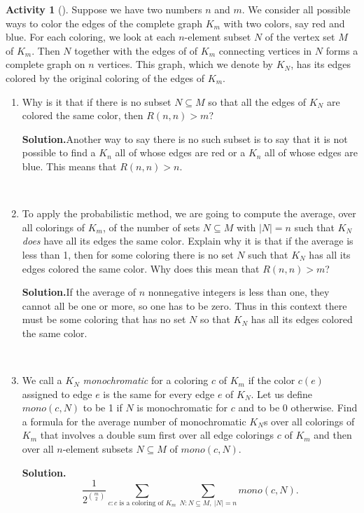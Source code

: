 \documentclass[10pt,]{book}
\theoremstyle{plain}
\theoremstyle{definition}
\newtheorem{activity}[project]{Activity}
\numberwithin{equation}{chapter}
\begin{document}
\begin{activity}[]\label{activity-82}
Suppose we have two numbers \(n\) and \(m\). We consider all possible ways to color the edges of the complete graph \(K_m\) with two colors, say red and blue. For each coloring, we look at each \(n\)-element subset \(N\) of the vertex set \(M\) of \(K_m\). Then \(N\) together with the edges of of \(K_m\) connecting vertices in \(N\) forms a complete graph on \(n\) vertices. This graph, which we denote by \(K_N\), has its edges colored by the original coloring of the edges of \(K_m\).%
~\par
\begin{enumerate}[label=(\alph*)]
 \item Why is it that if there is no subset \(N\subseteq M\) so that all the edges of \(K_N\) are colored the same color, then \(R(n,n)>m\)?%
\par\medskip\noindent%
\textbf{Solution.}\quad Another way to say there is no such subset is to say that it is not possible to find a \(K_n\) all of whose edges are red or a \(K_n\) all of whose edges are blue. This means that \(R(n,n)>n\).%

~\par
\item To apply the probabilistic method, we are going to compute the average, over all colorings of \(K_m\), of the number of sets \(N\subseteq M\) with \(|N|=n\) such that \(K_N\) \emph{does} have all its edges the same color. Explain why it is that if the average is less than 1, then for some coloring there is no set \(N\) such that \(K_N\) has all its edges colored the same color.  Why does this mean that \(R(n,n)>m\)?%
\par\medskip\noindent%
\textbf{Solution.}\quad If the average of \(n\) nonnegative integers is less than one, they cannot all be one or more, so one has to be zero. Thus in this context there must be some coloring that has no set \(N\) so that \(K_N\) has all its edges colored the same color.%

~\par
\item We call a \(K_N\) \emph{monochromatic} for a coloring \(c\) of \(K_m\) if the color \(c(e)\) assigned to edge \(e\) is the same for every edge \(e\) of \(K_N\).  Let us define \({ mono}(c,N)\) to be 1 if \(N\) is monochromatic for \(c\) and to be 0 otherwise.  Find a formula for the average number of monochromatic \(K_N\)s over all colorings of \(K_m\) that involves a double sum first over all edge colorings \(c\) of \(K_m\) and then over all \(n\)-element subsets \(N\subseteq M\) of \({
mono}(c,N)\).%
\par\medskip\noindent%
\textbf{Solution.}\quad %
\begin{equation*}
\frac{1}{2^{\binom{m}{2}}}\sum_{c:c\mbox{~is a coloring
of~} K_m}\sum_{N:N\subseteq M,~|N|=n}{ mono}(c,N).
\end{equation*}


\end{enumerate}
\end{activity}
\end{document}
